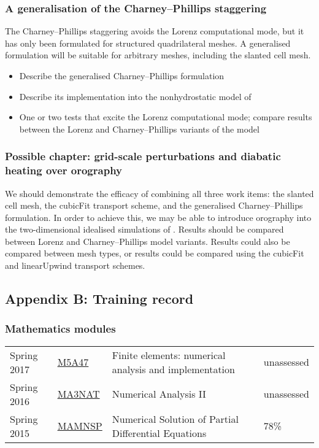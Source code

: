 \documentclass[a4paper,11pt]{article}
\begin{document}
\subsubsection*{A generalisation of the Charney--Phillips staggering}
\noindent The Charney--Phillips staggering avoids the Lorenz computational mode, but it has only been formulated for structured quadrilateral meshes.  A generalised formulation will be suitable for arbitrary meshes, including the slanted cell mesh.
\begin{itemize}[itemsep=0.1em]
	\item Describe the generalised Charney--Phillips formulation
	\item Describe its implementation into the nonhydrostatic model of \citet{weller-shahrokhi2014}
	\item One or two tests that excite the Lorenz computational mode; compare results between the Lorenz and Charney--Phillips variants of the model
\end{itemize}

\subsubsection*{Possible chapter: grid-scale perturbations and diabatic heating over orography}
\noindent We should demonstrate the efficacy of combining all three work items: the slanted cell mesh, the cubicFit transport scheme, and the generalised Charney--Phillips formulation.  In order to achieve this, we may be able to introduce orography into the two-dimensional idealised simulations of \citet{arakawa-konor1996}.
Results should be compared between Lorenz and Charney--Phillips model variants.  Results could also be compared between mesh types, or results could be compared using the cubicFit and linearUpwind transport schemes.

\newpage

\subsection*{Appendix B: Training record}

\subsubsection*{Mathematics modules}
\footnotesize
\begin{tabular}{l l l l}
Spring 2017	& \href{https://finite-element.github.io}{M5A47}  & Finite elements: numerical analysis and implementation & unassessed \\
Spring 2016	& \href{www.reading.ac.uk/module/document.aspx?modP=MA3NAT&modYR=1516}{MA3NAT} & Numerical Analysis II & unassessed \\
Spring 2015	& \href{www.reading.ac.uk/modules/document.aspx?modP=MAMNSP&modYR=1415}{MAMNSP} & Numerical Solution of Partial Differential Equations  & 78\% \\
\end{tabular}
\end{document}
